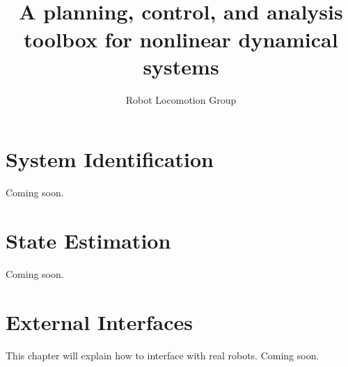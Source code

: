 \documentclass{book}
\title{{\Huge \drake}\\ {\huge A planning, control, and
    analysis toolbox for nonlinear dynamical systems}}
\author{\Large Robot Locomotion Group}
\begin{document}
\maketitle

\tableofcontents 













\chapter{System Identification}

Coming soon.

\chapter{State Estimation}

Coming soon.

\chapter{External Interfaces}

This chapter will explain how to interface with real robots.  Coming soon.

\appendix







\end{document}
